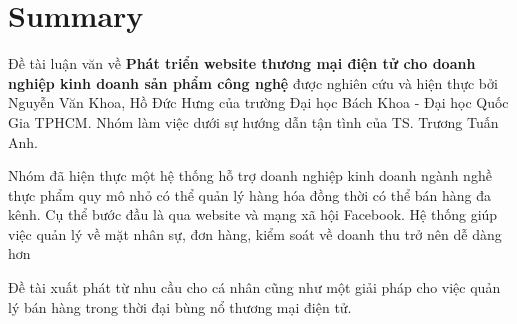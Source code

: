 \chapter{Summary}

Đề tài luận văn về \textbf{Phát triển website thương mại điện tử cho doanh nghiệp kinh doanh sản phẩm công nghệ} được nghiên cứu và hiện thực bởi Nguyễn Văn Khoa, Hồ Đức Hưng của trường Đại học Bách Khoa - Đại học Quốc Gia TPHCM. Nhóm làm việc dưới sự hướng dẫn tận tình của TS. Trương Tuấn Anh. \par

Nhóm đã hiện thực một hệ thống hỗ trợ doanh nghiệp kinh doanh ngành nghề thực phẩm quy mô nhỏ có thể quản lý hàng hóa đồng thời có thể bán hàng đa kênh. Cụ thể bước đầu là qua website và mạng xã hội Facebook. Hệ thống giúp việc quản lý về mặt nhân sự, đơn hàng, kiểm soát về doanh thu trở nên dễ dàng hơn \par

Đề tài xuất phát từ nhu cầu cho cá nhân cũng như một giải pháp cho việc quản lý bán hàng trong thời đại bùng nổ thương mại điện tử.

